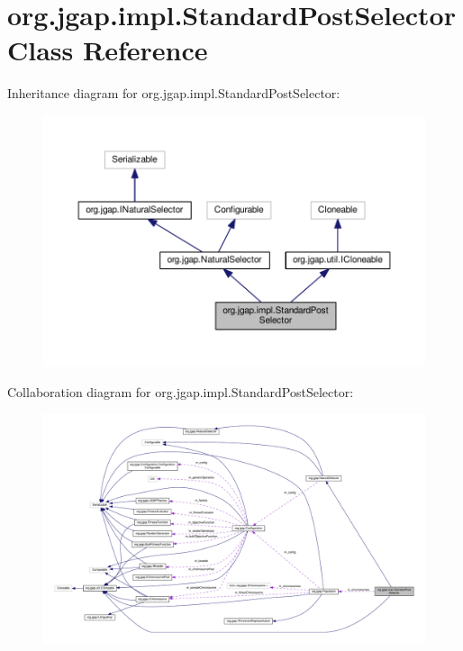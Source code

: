 \hypertarget{classorg_1_1jgap_1_1impl_1_1_standard_post_selector}{\section{org.\-jgap.\-impl.\-Standard\-Post\-Selector Class Reference}
\label{classorg_1_1jgap_1_1impl_1_1_standard_post_selector}
}


Inheritance diagram for org.\-jgap.\-impl.\-Standard\-Post\-Selector\-:
\nopagebreak
\begin{figure}[H]
\begin{center}
\leavevmode
\includegraphics[width=350pt]{classorg_1_1jgap_1_1impl_1_1_standard_post_selector__inherit__graph}
\end{center}
\end{figure}


Collaboration diagram for org.\-jgap.\-impl.\-Standard\-Post\-Selector\-:
\nopagebreak
\begin{figure}[H]
\begin{center}
\leavevmode
\includegraphics[width=350pt]{classorg_1_1jgap_1_1impl_1_1_standard_post_selector__coll__graph}
\end{center}
\end{figure}
